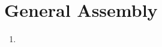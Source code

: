 \chapter{General Assembly}
\label{art:assembly}

\begin{enumerate}[label=\Alph*.]
\item 
\end{enumerate}
